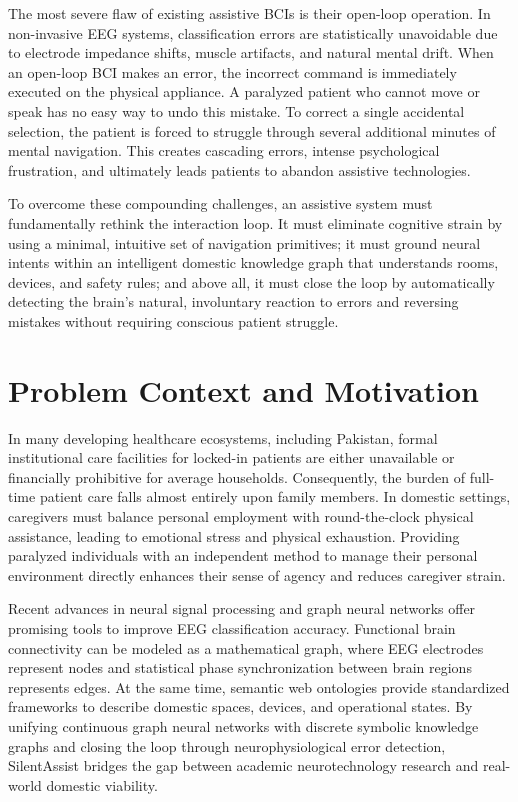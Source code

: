 \documentclass[12pt,a4paper]{report}
\begin{document}
The most severe flaw of existing assistive BCIs is their open-loop operation. In non-invasive EEG systems, classification errors are statistically unavoidable due to electrode impedance shifts, muscle artifacts, and natural mental drift. When an open-loop BCI makes an error, the incorrect command is immediately executed on the physical appliance. A paralyzed patient who cannot move or speak has no easy way to undo this mistake. To correct a single accidental selection, the patient is forced to struggle through several additional minutes of mental navigation. This creates cascading errors, intense psychological frustration, and ultimately leads patients to abandon assistive technologies.

To overcome these compounding challenges, an assistive system must fundamentally rethink the interaction loop. It must eliminate cognitive strain by using a minimal, intuitive set of navigation primitives; it must ground neural intents within an intelligent domestic knowledge graph that understands rooms, devices, and safety rules; and above all, it must close the loop by automatically detecting the brain's natural, involuntary reaction to errors and reversing mistakes without requiring conscious patient struggle.

\section{Problem Context and Motivation}
In many developing healthcare ecosystems, including Pakistan, formal institutional care facilities for locked-in patients are either unavailable or financially prohibitive for average households. Consequently, the burden of full-time patient care falls almost entirely upon family members. In domestic settings, caregivers must balance personal employment with round-the-clock physical assistance, leading to emotional stress and physical exhaustion. Providing paralyzed individuals with an independent method to manage their personal environment directly enhances their sense of agency and reduces caregiver strain.

Recent advances in neural signal processing and graph neural networks offer promising tools to improve EEG classification accuracy. Functional brain connectivity can be modeled as a mathematical graph, where EEG electrodes represent nodes and statistical phase synchronization between brain regions represents edges. At the same time, semantic web ontologies provide standardized frameworks to describe domestic spaces, devices, and operational states. By unifying continuous graph neural networks with discrete symbolic knowledge graphs and closing the loop through neurophysiological error detection, SilentAssist bridges the gap between academic neurotechnology research and real-world domestic viability.
\end{document}
